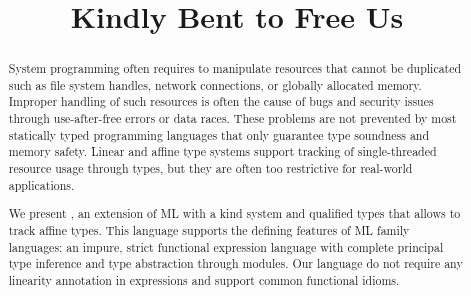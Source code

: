 \documentclass[acmsmall,review,anonymous,table]{acmart}
\begin{document}
\title{Kindly Bent to Free Us}
\begin{abstract}
  System programming often requires to manipulate resources that
  cannot be duplicated such as file system handles, network connections,
  or globally allocated memory.
  Improper handling of such resources is often the cause of bugs and security issues
  through use-after-free errors or data races. These problems are not
  prevented by most statically typed programming languages that only
  guarantee type soundness and memory safety.
  Linear and affine type systems support tracking of single-threaded resource usage
  through types, but they are often too restrictive for real-world applications.

  We present \lang, an extension of ML with a kind system and qualified
  types that allows to track affine types.
  This language supports the defining features of ML family languages:
  an impure, strict functional expression language with complete principal type
  inference and type abstraction through modules.
  Our language do not require any linearity annotation in
  expressions and support common functional idioms.
\end{abstract}


\maketitle











\end{document}
